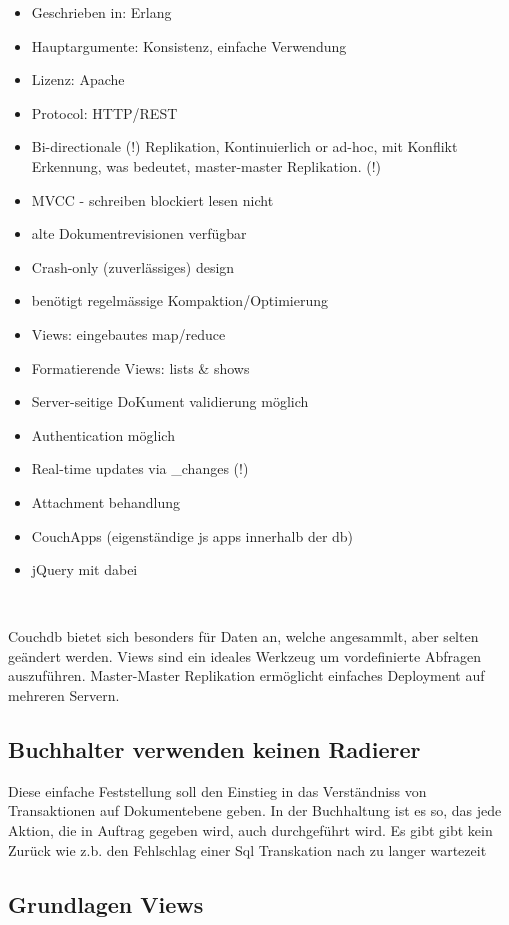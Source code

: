 \begin{itemize}
\item Geschrieben in: Erlang
\item Hauptargumente: Konsistenz, einfache Verwendung
\item Lizenz: Apache
\item Protocol: HTTP/REST
\item Bi-directionale (!) Replikation,
    Kontinuierlich or ad-hoc,
    mit Konflikt Erkennung,
    was bedeutet, master-master Replikation. (!)

\item MVCC - schreiben blockiert lesen nicht
\item alte Dokumentrevisionen verfügbar
\item Crash-only (zuverlässiges) design
\item benötigt regelmässige Kompaktion/Optimierung
\item Views: eingebautes map/reduce
\item Formatierende Views: lists \& shows
\item Server-seitige DoKument validierung möglich
\item Authentication möglich
\item Real-time updates via \_changes (!)
\item Attachment behandlung
\item CouchApps (eigenständige js apps innerhalb der db)
\item jQuery mit dabei
\end{itemize}
~ \cite{web:db-compare}


Couchdb bietet sich besonders für Daten an, welche angesammlt, aber selten geändert werden.
Views sind ein ideales Werkzeug um vordefinierte Abfragen auszuführen.
Master-Master Replikation ermöglicht einfaches Deployment auf mehreren Servern.


\subsection{Buchhalter verwenden keinen Radierer}

Diese einfache Feststellung soll den Einstieg in das Verständniss von Transaktionen auf Dokumentebene geben.
In der Buchhaltung ist es so, das jede Aktion, die in Auftrag gegeben wird, auch durchgeführt wird.
Es gibt gibt kein Zurück wie z.b. den Fehlschlag einer Sql Transkation nach zu langer wartezeit

\subsection{Grundlagen Views}



